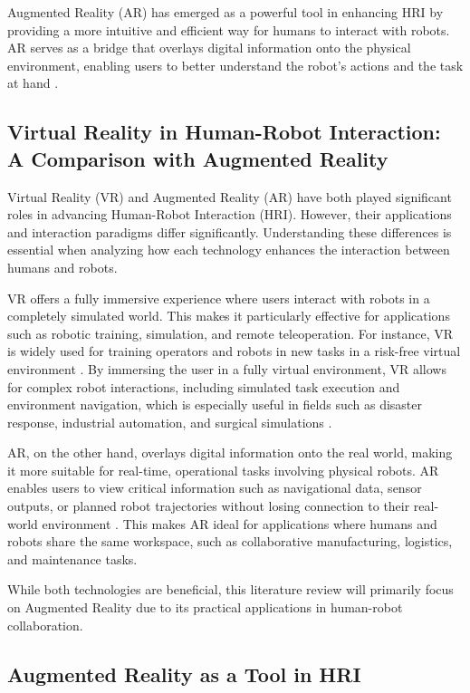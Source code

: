 Augmented Reality (AR) has emerged as a powerful tool in enhancing HRI by providing a more intuitive and efficient way for humans to interact with robots. AR serves as a bridge that overlays digital information onto the physical environment, enabling users to better understand the robot’s actions and the task at hand \cite{Suzuki2022}. 

\subsection{Virtual Reality in Human-Robot Interaction: A Comparison with Augmented Reality}

Virtual Reality (VR) and Augmented Reality (AR) have both played significant roles in advancing Human-Robot Interaction (HRI). However, their applications and interaction paradigms differ significantly. Understanding these differences is essential when analyzing how each technology enhances the interaction between humans and robots.

VR offers a fully immersive experience where users interact with robots in a completely simulated world. This makes it particularly effective for applications such as robotic training, simulation, and remote teleoperation. For instance, VR is widely used for training operators and robots in new tasks in a risk-free virtual environment \cite{Coronado2023}. By immersing the user in a fully virtual environment, VR allows for complex robot interactions, including simulated task execution and environment navigation, which is especially useful in fields such as disaster response, industrial automation, and surgical simulations \cite{Gul2022}.

AR, on the other hand, overlays digital information onto the real world, making it more suitable for real-time, operational tasks involving physical robots. AR enables users to view critical information such as navigational data, sensor outputs, or planned robot trajectories without losing connection to their real-world environment \cite{García2019}. This makes AR ideal for applications where humans and robots share the same workspace, such as collaborative manufacturing, logistics, and maintenance tasks.

While both technologies are beneficial, this literature review will primarily focus on Augmented Reality due to its practical applications in human-robot collaboration. 

\subsection{Augmented Reality as a Tool in HRI}

